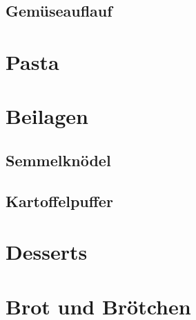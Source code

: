 \documentclass[ngerman,11pt,parskip=half,a5paper,twoside]{scrbook}
\begin{document}

\clearpage

	\section{Gemüseauflauf} 
	 
	\clearpage
	
\chapter{Pasta}

\clearpage

\chapter{Beilagen}

\clearpage

	\section{Semmelknödel} 
	 
	\clearpage

	\section{Kartoffelpuffer} 
	 
	\clearpage
	
\chapter{Desserts}


\clearpage

\chapter{Brot und Brötchen}
\end{document}
